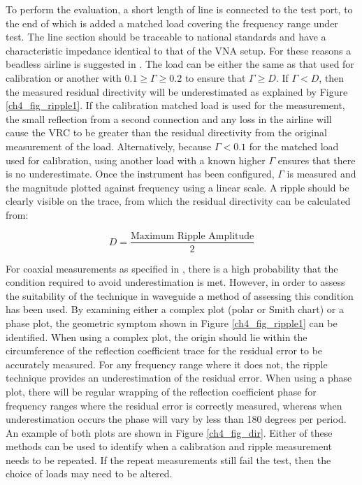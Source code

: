 \documentclass[../thesis/thesis.tex]{subfiles}
\begin{document}
\begin{refsection}
To perform the evaluation, a short length of line is connected to the test port, to the end of which is added a matched load covering the frequency range under test. The line section should be traceable to national standards and have a characteristic impedance identical to that of the VNA setup. For these reasons a beadless airline is suggested in \cite{EURAMET_2011}. The load can be either the same as that used for calibration or another with $0.1 \ge \Gamma \ge 0.2$ to ensure that $\Gamma \ge D$. If $\Gamma < D$, then the measured residual directivity will be underestimated as explained by Figure \ref{ch4_fig_ripple1}. If the calibration matched load is used for the measurement, the small reflection from a second connection and any loss in the airline will cause the VRC to be greater than the residual directivity from the original measurement of the load. Alternatively, because $\Gamma < 0.1$ for the matched load used for calibration, using another load with a known higher $\Gamma$ ensures that there is no underestimate. Once the instrument has been configured, $\Gamma$ is measured and the magnitude plotted against frequency using a linear scale. A ripple should be clearly visible on the trace, from which the residual directivity can be calculated from:

\begin{equation}
D = \frac{\textrm{Maximum Ripple Amplitude}}{2}
\end{equation}

For coaxial measurements as specified in \cite{EURAMET_2011}, there is a high probability that the condition required to avoid underestimation is met. However, in order to assess the suitability of the technique in waveguide a method of assessing this condition has been used. By examining either a complex plot (polar or Smith chart) or a phase plot, the geometric symptom shown in Figure \ref{ch4_fig_ripple1} can be identified. When using a complex plot, the origin should lie within the circumference of the reflection coefficient trace for the residual error to be accurately measured. For any frequency range where it does not, the ripple technique provides an underestimation of the residual error. When using a phase plot, there will be regular wrapping of the reflection coefficient phase for frequency ranges where the residual error is correctly measured, whereas when underestimation occurs the phase will vary by less than 180 degrees per period. An example of both plots are shown in Figure \ref{ch4_fig_dir}. Either of these methods can be used to identify when a calibration and ripple measurement needs to be repeated. If the repeat measurements still fail the test, then the choice of loads may need to be altered.


\end{refsection}
\end{document}
